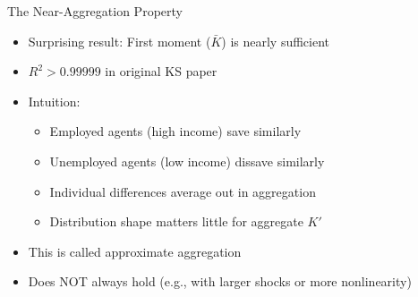 \documentclass[aspectratio=169]{beamer}
\newcommand{\1}{\mathbf{1}}
\begin{document}
\begin{frame}{The Near-Aggregation Property}
  \begin{itemize}
      \item Surprising result: First moment ($\bar{K}$) is nearly sufficient
      \item $R^2 > 0.99999$ in original KS paper
      \item Intuition:
      \begin{itemize}
          \item Employed agents (high income) save similarly
          \item Unemployed agents (low income) dissave similarly
          \item Individual differences average out in aggregation
          \item Distribution shape matters little for aggregate $K'$
      \end{itemize}
      \item This is called approximate aggregation
      \item Does NOT always hold (e.g., with larger shocks or more nonlinearity)
  \end{itemize}
\end{frame}
\end{document}
